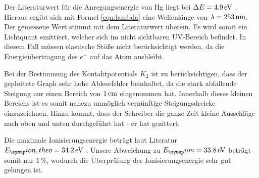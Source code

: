 Der Literaturwert für die Anregungsenergie von Hg liegt bei $\Delta E=4.9\,\si{\electronvolt}$
\cite{hg}. Hieraus ergibt sich mit Formel \eqref{eqn:lambda} eine Wellenlänge
von $\lambda=253\,\si{\nano\meter}$. Der gemessene Wert stimmt mit dem Literaturwert überein.
Es wird somit ein Lichtquant emittiert, welcher sich im nicht sichtbaren
UV-Bereich befindet.
In diesem Fall müssen elastische Stöße nicht berücksichtigt werden, da die
Energieübertragung des $e^-$ auf das Atom ausbleibt.

Bei der Bestimmung des Kontaktpotentials $K_2$ ist zu berücksichtigen, dass der
geplottete Graph sehr hohe Ablesefehler beinhaltet, da die stark abfallende Steigung
nur einen Bereich von $1\,\si{\centi\meter}$ eingenommen hat. Innerhalb dieses kleinen Bereichs
ist es somit nahezu unmöglich vernünftige Steigungsdreicke einzuzeichnen. Hinzu
kommt, dass der Schreiber die ganze Zeit kleine Ausschläge nach oben und unten
durchgeführt hat - er hat gezittert.

Die maximale Ionisierungsenergie beträgt laut Literatur $E_\su{ion, theo} = 34.2\eV$ \cite{theo}.
Unsere Abweichung zu  $E_\su{ion} = 33.8\eV$ beträgt somit nur $1\,\%$, wodurch
die Überprüfung der Ionisierungsenergie sehr gut gelungen ist.
